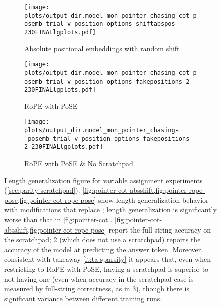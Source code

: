 \begin{figure}[h]
  \centering
    \begin{subfigure}[b]{0.45\textwidth}  \texttt{[image: plots/output\_dir.model\_mon\_pointer\_chasing\_cot\_posemb\_trial\_v\_position\_options-shiftabspos-230FINALlgplots.pdf]}
      \caption{Absolute positional embeddings with random shift}
      \label{fig:pointer-cot-absshift}
    \end{subfigure}
    \begin{subfigure}[b]{0.45\textwidth}
      \texttt{[image: plots/output\_dir.model\_mon\_pointer\_chasing\_cot\_posemb\_trial\_v\_position\_options-fakepositions-2-230FINALlgplots.pdf]}
      \caption{RoPE with PoSE}
      \label{fig:pointer-rope-pose}
    \end{subfigure}
        \begin{subfigure}[b]{0.45\textwidth}
      \texttt{[image: plots/output\_dir.model\_mon\_pointer\_chasing-\_posemb\_trial\_v\_position\_options-fakepositions-2-230FINALlgplots.pdf]}
      \caption{RoPE with PoSE \& No Scratchpad}
      \label{fig:pointer-cot-rope-pose}
    \end{subfigure}


    \caption{Length generalization figure for variable assignment experiments (\cref{sec:parity-scratchpad}). \cref{fig:pointer-cot-absshift,fig:pointer-rope-pose,fig:pointer-cot-rope-pose} show length generalization behavior with modifications that replace \predpc; length generalization is significantly worse than that in \cref{fig:pointer-cot}. \cref{fig:pointer-cot-absshift,fig:pointer-cot-rope-pose} report the full-string accuracy on the scratchpad; \cref{fig:pointer-rope-pose} (which does not use a scratchpad) reports the accuracy of the model at predicting the answer token. Moreover, consistent with takeaway \ref{it:ta-sparsity} it appears that, even when restricting to RoPE with PoSE, having a scratchpad is superior to not having one (even when accuracy in the scratchpad case is measured by full-string correctness, as in \cref{fig:pointer-cot-rope-pose}), though there is significant variance between different training runs. }
    \label{fig:pointer-cot-appendix}
  \end{figure}
